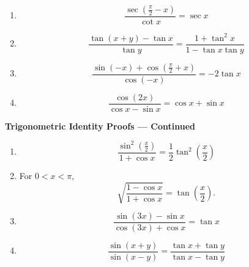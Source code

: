 \documentclass[12pt]{article}
\begin{document}
\begin{enumerate}[leftmargin=*,itemsep=0pt,resume]
  \item
  \[
    \frac{\sec\left(\frac{\pi}{2}-x\right)}{\cot x}=\sec x
  \]

  \item
  \[
    \frac{\tan(x+y)-\tan x}{\tan y}
    =\frac{1+\tan^2x}{1-\tan x\tan y}
  \]

  \item
  \[
    \frac{\sin(-x)+\cos\left(\frac{\pi}{2}+x\right)}{\cos(-x)}
    =-2\tan x
  \]

  \item
  \[
    \frac{\cos(2x)}{\cos x-\sin x}=\cos x+\sin x
  \]
\end{enumerate}

\newpage
\begin{center}
  {\large\textbf{Trigonometric Identity Proofs --- Continued}}
\end{center}

\begin{enumerate}[leftmargin=*,itemsep=0pt,resume]
  \item
  \[
    \frac{\sin^2\left(\frac{x}{2}\right)}{1+\cos x}
    =\frac12\tan^2\left(\frac{x}{2}\right)
  \]

  \item For $0<x<\pi$,
  \[
    \sqrt{\frac{1-\cos x}{1+\cos x}}=\tan\left(\frac{x}{2}\right).
  \]

  \item
  \[
    \frac{\sin(3x)-\sin x}{\cos(3x)+\cos x}=\tan x
  \]

  \item
  \[
    \frac{\sin(x+y)}{\sin(x-y)}
    =\frac{\tan x+\tan y}{\tan x-\tan y}
  \]
\end{enumerate}
\end{document}
